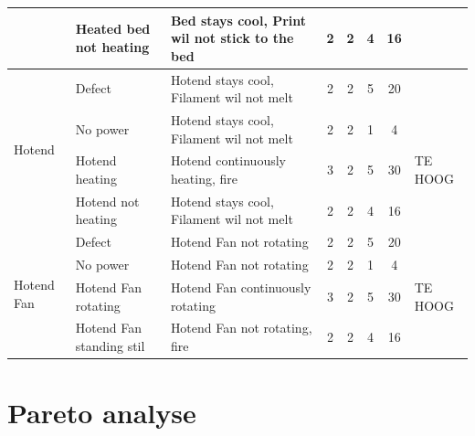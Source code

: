 \documentclass{article}
\begin{document}
\begin{landscape}
\begin{longtable}{|l|l|l|c|c|c|c|l|}
                                            & Heated bed not heating    & Bed stays cool, Print wil not stick to the bed    & 2 & 2 & 4 & 16 & \\ 
                                            \hline 
        \multirow{4}{*}{Hotend}             & Defect                    & Hotend stays cool, Filament wil not melt          & 2 & 2 & 5 & 20 & \\
                                            & No power                  & Hotend stays cool, Filament wil not melt          & 2 & 2 & 1 &  4 & \\
                                            & Hotend heating            & Hotend continuously heating, fire                 & 3 & 2 & 5 & 30 & TE HOOG \\
                                            & Hotend not heating        & Hotend stays cool, Filament wil not melt          & 2 & 2 & 4 & 16 & \\ 
                                            \hline
        \multirow{4}{*}{Hotend Fan}         & Defect                    & Hotend Fan not rotating                           & 2 & 2 & 5 & 20 & \\
                                            & No power                  & Hotend Fan not rotating                           & 2 & 2 & 1 &  4 & \\
                                            & Hotend Fan rotating       & Hotend Fan continuously rotating                  & 3 & 2 & 5 & 30 & TE HOOG \\
                                            & Hotend Fan standing stil  & Hotend Fan not rotating, fire                     & 2 & 2 & 4 & 16 & \\ 
                                            \hline   
    \end{longtable}
\end{landscape}


\newpage
\section{Pareto analyse}


\newpage
% 
% 


\end{document}
